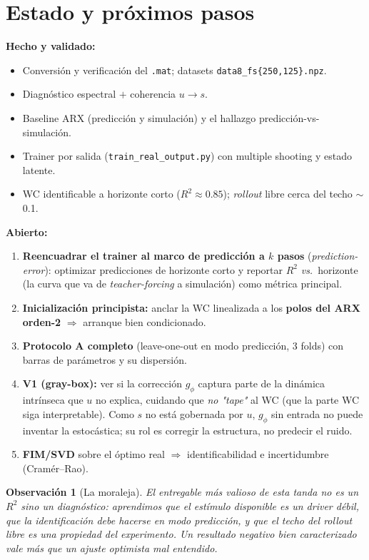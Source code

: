 \documentclass[11pt,a4paper]{article}
\newtheorem{remark}{Observación}
\begin{document}
\section{Estado y próximos pasos}
\textbf{Hecho y validado:}
\begin{itemize}[leftmargin=1.4em, itemsep=1pt]
  \item Conversión y verificación del \texttt{.mat}; datasets \texttt{data8\_fs\{250,125\}.npz}.
  \item Diagnóstico espectral $+$ coherencia $u\to s$.
  \item Baseline ARX (predicción y simulación) y el hallazgo predicción-vs-simulación.
  \item Trainer por salida (\texttt{train\_real\_output.py}) con multiple shooting y estado latente.
  \item WC identificable a horizonte corto ($R^2\approx0.85$); \emph{rollout} libre cerca del techo $\sim$0.1.
\end{itemize}

\textbf{Abierto:}
\begin{enumerate}[leftmargin=1.6em, itemsep=1pt]
  \item \textbf{Reencuadrar el trainer al marco de predicción a $k$ pasos} (\emph{prediction-error}): optimizar predicciones de horizonte corto y reportar $R^2$ \emph{vs.}\ horizonte (la curva que va de \emph{teacher-forcing} a simulación) como métrica principal.
  \item \textbf{Inicialización principista:} anclar la WC linealizada a los \textbf{polos del ARX orden-2} $\Rightarrow$ arranque bien condicionado.
  \item \textbf{Protocolo A completo} (leave-one-out en modo predicción, 3 folds) con barras de parámetros y su dispersión.
  \item \textbf{V1 (gray-box):} ver si la corrección $g_\phi$ captura parte de la dinámica intrínseca que $u$ no explica, cuidando que \emph{no "tape"} al WC (que la parte WC siga interpretable). Como $s$ no está gobernada por $u$, $g_\phi$ sin entrada no puede inventar la estocástica; su rol es corregir la estructura, no predecir el ruido.
  \item \textbf{FIM/SVD} sobre el óptimo real $\Rightarrow$ identificabilidad e incertidumbre (Cramér--Rao).
\end{enumerate}

\begin{remark}[La moraleja]
El entregable más valioso de esta tanda no es un $R^2$ sino un \emph{diagnóstico}: aprendimos que el estímulo disponible es un \emph{driver} débil, que la identificación debe hacerse en modo predicción, y que el techo del \emph{rollout} libre es una propiedad del experimento. Un resultado negativo bien caracterizado vale más que un ajuste optimista mal entendido.
\end{remark}
\end{document}
